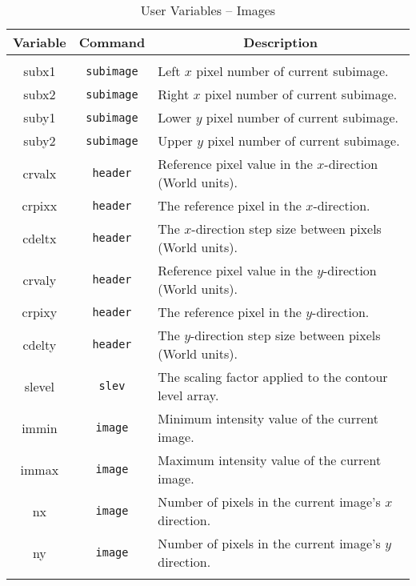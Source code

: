\begin{table}
  \caption{User Variables -- Images}
  \centering
  \setlength{\tabentrylen}{\textwidth}
  \addtolength{\tabentrylen}{-1.6in}
  \begin{tabular}{|c|c|p{\tabentrylen}|} \hline\hline
    \multicolumn{1}{|c}{Variable}
    & \multicolumn{1}{|c|}{Command}
    & \multicolumn{1}{|c|}{Description} \\ \hline
    && \\
    subx1  & {\tt subimage} & Left $x$ pixel number of current subimage. \\
    subx2  & {\tt subimage} & Right $x$ pixel number of current subimage. \\
    suby1  & {\tt subimage} & Lower $y$ pixel number of current subimage. \\
    suby2  & {\tt subimage} & Upper $y$ pixel number of current subimage. \\
    crvalx & {\tt header}
           & Reference pixel value in the $x$-direction (World units). \\
    crpixx & {\tt header}   & The reference pixel in the $x$-direction. \\
    cdeltx & {\tt header}
           & The $x$-direction step size between pixels (World units). \\
    crvaly & {\tt header}
           & Reference pixel value in the $y$-direction (World units). \\
    crpixy & {\tt header}   & The reference pixel in the $y$-direction. \\
    cdelty & {\tt header}
           & The $y$-direction step size between pixels (World units). \\
    slevel & {\tt slev}
           & The scaling factor applied to the contour level array. \\
    immin  & {\tt image}    & Minimum intensity value of the current image. \\
    immax  & {\tt image}    & Maximum intensity value of the current image. \\
    nx     & {\tt image}
           & Number of pixels in the current image's $x$ direction. \\
    ny     & {\tt image}
           & Number of pixels in the current image's $y$ direction. \\
    && \\ \hline\hline
  \end{tabular}
\end{table}
